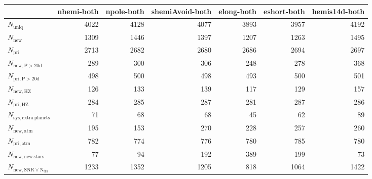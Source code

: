 \begin{tabular}{lrrrrrr}
\toprule
{} &  nhemi-both &  npole-both &  shemiAvoid-both &  elong-both &  eshort-both &  hemis14d-both \\
\midrule
$N_{\mathrm{uniq}}$                &        4022 &        4128 &             4077 &        3893 &         3957 &           4192 \\
$N_{\mathrm{new}}$                 &        1309 &        1446 &             1397 &        1207 &         1263 &           1495 \\
$N_{\mathrm{pri}}$                 &        2713 &        2682 &             2680 &        2686 &         2694 &           2697 \\
$N_{\mathrm{new,P>20d}}$           &         289 &         300 &              306 &         248 &          278 &            368 \\
$N_{\mathrm{pri,P>20d}}$           &         498 &         500 &              498 &         493 &          500 &            501 \\
$N_{\mathrm{new,HZ}}$              &         126 &         133 &              139 &         117 &          129 &            157 \\
$N_{\mathrm{pri,HZ}}$              &         284 &         285 &              287 &         281 &          287 &            286 \\
$N_{\mathrm{sys,extra\ planets}}$  &          71 &          68 &               68 &          45 &           62 &             89 \\
$N_{\mathrm{new,atm}}$             &         195 &         153 &              270 &         228 &          257 &            260 \\
$N_{\mathrm{pri,atm}}$             &         782 &         774 &              776 &         780 &          785 &            780 \\
$N_{\mathrm{new,new\ stars}}$      &          77 &          94 &              192 &         389 &          199 &             73 \\
$N_{\mathrm{new,SNR\lor N_{tra}}}$ &        1233 &        1352 &             1205 &         818 &         1064 &           1422 \\
\bottomrule
\end{tabular}
